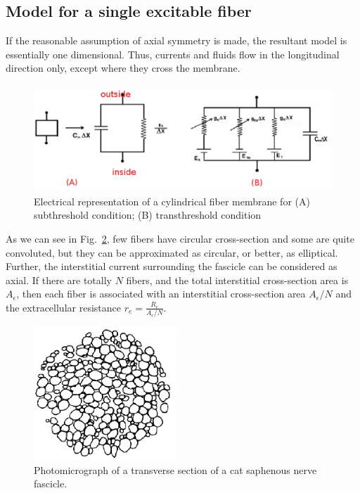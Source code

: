 \subsection{Model for a single excitable fiber}
\label{sec:model-for-single}

If the reasonable assumption of axial symmetry is made, the resultant
model is essentially one dimensional. Thus, currents and fluids flow
in the longitudinal direction only, except where they cross the
membrane.
\begin{figure}[hbt]
  \centerline{\includegraphics[height=4cm,
    angle=0]{./images/core-conductor.eps}}
  \caption{Electrical representation of a cylindrical fiber membrane
    for (A) subthreshold condition; (B) transthreshold condition}
\label{fig:core-conductor}
\end{figure}

As we can see in Fig.~\ref{fig:cat_fascicle}, few fibers have circular
cross-section and some are quite convoluted, but they can be
approximated as circular, or better, as elliptical. Further, the
interstitial current surrounding the fascicle can be considered as
axial. If there are totally $N$ fibers, and the total interstitial
cross-section area is $A_\epsilon$, then each fiber is associated with
an interstitial cross-section area $A_\epsilon/N$ and the
extracellular resistance $r_e=\frac{R_e}{A_\epsilon/N}$.
\begin{figure}[hbt]
  \centerline{\includegraphics[height=5cm,
    angle=0]{./images/cat_nerve.eps}}
\caption{Photomicrograph of a transverse section of a cat saphenous
  nerve fascicle.}
\label{fig:cat_fascicle}
\end{figure}

